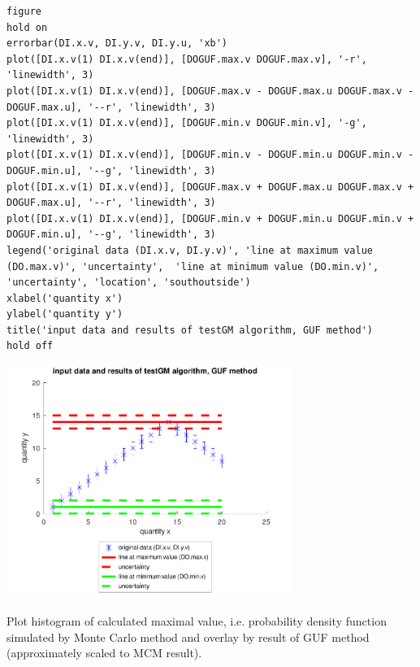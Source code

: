 \begin{lstlisting}
figure
hold on
errorbar(DI.x.v, DI.y.v, DI.y.u, 'xb')
plot([DI.x.v(1) DI.x.v(end)], [DOGUF.max.v DOGUF.max.v], '-r', 'linewidth', 3)
plot([DI.x.v(1) DI.x.v(end)], [DOGUF.max.v - DOGUF.max.u DOGUF.max.v - DOGUF.max.u], '--r', 'linewidth', 3)
plot([DI.x.v(1) DI.x.v(end)], [DOGUF.min.v DOGUF.min.v], '-g', 'linewidth', 3)
plot([DI.x.v(1) DI.x.v(end)], [DOGUF.min.v - DOGUF.min.u DOGUF.min.v - DOGUF.min.u], '--g', 'linewidth', 3)
plot([DI.x.v(1) DI.x.v(end)], [DOGUF.max.v + DOGUF.max.u DOGUF.max.v + DOGUF.max.u], '--r', 'linewidth', 3)
plot([DI.x.v(1) DI.x.v(end)], [DOGUF.min.v + DOGUF.min.u DOGUF.min.v + DOGUF.min.u], '--g', 'linewidth', 3)
legend('original data (DI.x.v, DI.y.v)', 'line at maximum value (DO.max.v)', 'uncertainty',  'line at minimum value (DO.min.v)', 'uncertainty', 'location', 'southoutside')
xlabel('quantity x')
ylabel('quantity y')
title('input data and results of testGM algorithm, GUF method')
hold off
\end{lstlisting}
\begin{center}
\includegraphics[width=0.7\textwidth]{algs_examples_published/testGM_alg_example-1.pdf}
\end{center}


Plot histogram of calculated maximal value, i.e. probability density function simulated by Monte
Carlo method and overlay by result of GUF method (approximately scaled to MCM result).

